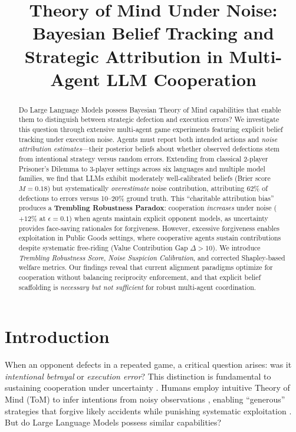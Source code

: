 \documentclass{uai2026} %
\title{Theory of Mind Under Noise: Bayesian Belief Tracking and\\Strategic Attribution in Multi-Agent LLM Cooperation\@}
\author{}
\begin{document}
\maketitle

\begin{abstract}
Do Large Language Models possess Bayesian Theory of Mind capabilities that enable them to distinguish between strategic defection and execution errors? We investigate this question through extensive multi-agent game experiments featuring explicit belief tracking under execution noise. Agents must report both intended actions and \textit{noise attribution estimates}---their posterior beliefs about whether observed defections stem from intentional strategy versus random errors. Extending from classical 2-player Prisoner's Dilemma to 3-player settings across six languages and multiple model families, we find that LLMs exhibit moderately well-calibrated beliefs (Brier score $M=0.18$) but systematically \textit{overestimate} noise contribution, attributing 62\% of defections to errors versus 10--20\% ground truth. This ``charitable attribution bias'' produces a \textbf{Trembling Robustness Paradox}: cooperation \textit{increases} under noise ($+12\%$ at $\epsilon=0.1$) when agents maintain explicit opponent models, as uncertainty provides face-saving rationales for forgiveness. However, excessive forgiveness enables exploitation in Public Goods settings, where cooperative agents sustain contributions despite systematic free-riding (Value Contribution Gap $\Delta > 10$). We introduce \textit{Trembling Robustness Score}, \textit{Noise Suspicion Calibration}, and corrected Shapley-based welfare metrics. Our findings reveal that current alignment paradigms optimize for cooperation without balancing reciprocity enforcement, and that explicit belief scaffolding is \textit{necessary but not sufficient} for robust multi-agent coordination.
\end{abstract}

\section{Introduction}\label{sec:intro}

When an opponent defects in a repeated game, a critical question arises: was it \textit{intentional betrayal} or \textit{execution error}? This distinction is fundamental to sustaining cooperation under uncertainty \citep{selten1975reexamination,nowak1992tit}. Humans employ intuitive Theory of Mind (ToM) to infer intentions from noisy observations \citep{baker2017rational}, enabling ``generous'' strategies that forgive likely accidents while punishing systematic exploitation \citep{nowak1993strategy}. But do Large Language Models possess similar capabilities?
\end{document}
